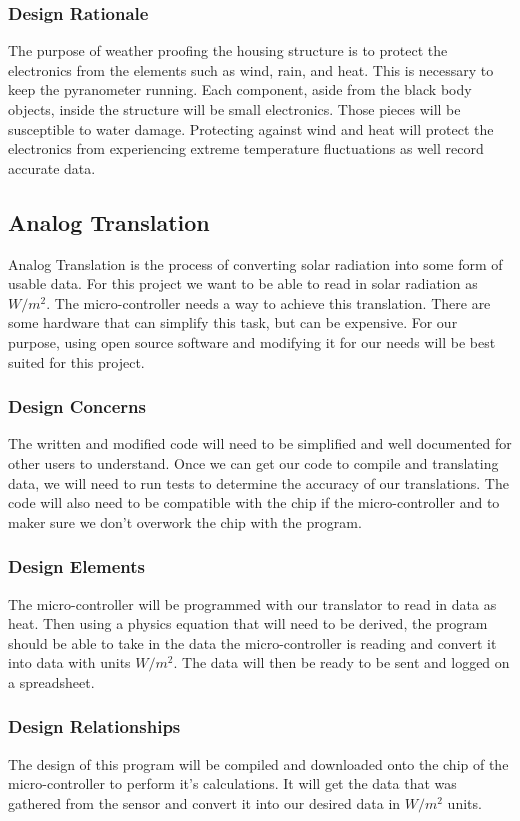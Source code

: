\documentclass[10pt,draftclsnofoot,onecolumn,letterpaper]{article}
\begin{document}
\subsubsection{Design Rationale}
The purpose of weather proofing the housing structure is to protect the electronics from the elements such as wind, rain, and heat. This is necessary to keep the pyranometer running. Each component, aside from the black body objects, inside the structure will be small electronics. Those pieces will be susceptible to water damage. Protecting against wind and heat will protect the electronics from experiencing extreme temperature fluctuations as well record accurate data.

\subsection{Analog Translation}
Analog Translation is the process of converting solar radiation into some form of usable data. For this project we want to be able to read in solar radiation as $W/m^2$. The micro-controller needs a way to achieve this translation. There are some hardware that can simplify this task, but can be expensive. For our purpose, using open source software and modifying it for our needs will be best suited for this project.
\subsubsection{Design Concerns}
The written and modified code will need to be simplified and well documented for other users to understand. Once we can get our code to compile and translating data, we will need to run tests to determine the accuracy of our translations. The code will also need to be compatible with the chip if the micro-controller and to maker sure we don't overwork the chip with the program.
\subsubsection{Design Elements}
The micro-controller will be programmed with our translator to read in data as heat. Then using a physics equation that will need to be derived, the program should be able to take in the data the micro-controller is reading and convert it into data with units $W/m^2$. The data will then be ready to be sent and logged on a spreadsheet.

\subsubsection{Design Relationships}
The design of this program will be compiled and downloaded onto the chip of the micro-controller to perform it's calculations. It will get the data that was gathered from the sensor and convert it into our desired data in $W/m^2$ units.
\end{document}
